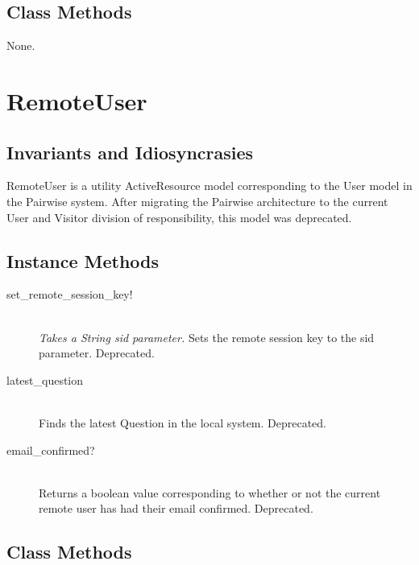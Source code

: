 \documentclass[11pt]{book}
\begin{document}
\subsection{Class Methods}

None.












\section{RemoteUser}

\subsection{Invariants and Idiosyncrasies}

RemoteUser is a utility ActiveResource model corresponding to the User model in the Pairwise system.  After migrating the Pairwise architecture to the current User and Visitor division of responsibility, this model was deprecated.

\subsection{Instance Methods}

\begin{description}
	\item[set\_remote\_session\_key!]  \hfill \\
  \emph{Takes a String sid parameter.}  Sets the remote session key to the sid parameter.  Deprecated.

	\item[latest\_question]  \hfill \\
  \emph{} Finds the latest Question in the local system.  Deprecated.

	\item[email\_confirmed?]  \hfill \\
  \emph{} Returns a boolean value corresponding to whether or not the current remote user has had their email confirmed.  Deprecated.

\end{description}


\subsection{Class Methods}
\end{document}
